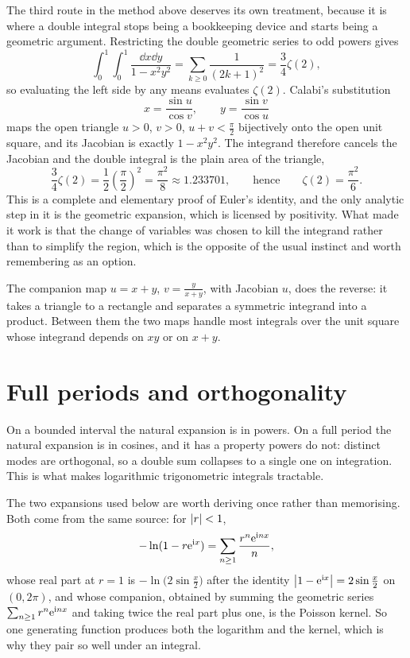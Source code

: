 The third route in the method above deserves its own treatment, because it is where a double integral stops being a bookkeeping device and starts being a geometric argument. Restricting the double geometric series to odd powers gives
\[\int_0^1\!\!\int_0^1\frac{\dd x\dd y}{1-x^{2}y^{2}}=\sum_{k\geq0}\frac{1}{(2k+1)^{2}}=\frac34\zeta(2),\]
so evaluating the left side by any means evaluates $\zeta(2)$. Calabi's substitution
\[x=\frac{\sin u}{\cos v},\qquad y=\frac{\sin v}{\cos u}\]
maps the open triangle $u>0$, $v>0$, $u+v<\tfrac{\pi}{2}$ bijectively onto the open unit square, and its Jacobian is exactly $1-x^{2}y^{2}$. The integrand therefore cancels the Jacobian and the double integral is the plain area of the triangle,
\[\frac34\zeta(2)=\frac12\left(\frac{\pi}{2}\right)^{2}=\frac{\pi^{2}}{8}\approx1.233701,\qquad\text{hence}\qquad \zeta(2)=\frac{\pi^{2}}{6}.\]
This is a complete and elementary proof of Euler's identity, and the only analytic step in it is the geometric expansion, which is licensed by positivity. What made it work is that the change of variables was chosen to kill the integrand rather than to simplify the region, which is the opposite of the usual instinct and worth remembering as an option.

The companion map $u=x+y$, $v=\tfrac{y}{x+y}$, with Jacobian $u$, does the reverse: it takes a triangle to a rectangle and separates a symmetric integrand into a product. Between them the two maps handle most integrals over the unit square whose integrand depends on $xy$ or on $x+y$.

\section{Full periods and orthogonality}

On a bounded interval the natural expansion is in powers. On a full period the natural expansion is in cosines, and it has a property powers do not: distinct modes are orthogonal, so a double sum collapses to a single one on integration. This is what makes logarithmic trigonometric integrals tractable.

The two expansions used below are worth deriving once rather than memorising. Both come from the same source: for $\left\lvert r\right\rvert<1$,
\[-\ln(1-r\mathrm{e}^{\mathrm{i} x})=\sum_{n\geq1}\frac{r^{n}\mathrm{e}^{\mathrm{i} nx}}{n},\]
whose real part at $r=1$ is $-\ln\bigl(2\sin\tfrac x2\bigr)$ after the identity $\left\lvert 1-\mathrm{e}^{\mathrm{i} x}\right\rvert=2\sin\tfrac x2$ on $(0,2\pi)$, and whose companion, obtained by summing the geometric series $\sum_{n\geq1}r^{n}\mathrm{e}^{\mathrm{i} nx}$ and taking twice the real part plus one, is the Poisson kernel. So one generating function produces both the logarithm and the kernel, which is why they pair so well under an integral.

